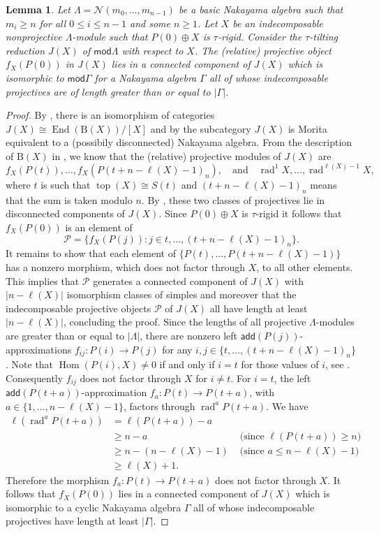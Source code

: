 \documentclass[11pt]{amsart}
\newcommand{\add}{\mathsf{add}}
\newcommand{\mods}{\mathsf{mod}}
\newcommand{\bcomp}{\mathrm{B}}
\newcommand{\Pcal}{\mathcal{P}}
\DeclareMathOperator{\Hom}{\mathrm{Hom}}
\DeclareMathOperator{\End}{\mathrm{End}}
\DeclareMathOperator{\topp}{\mathrm{top}}
\DeclareMathOperator{\rad}{\mathrm{rad}}
\newtheorem{lemma}[theorem]{Lemma}
\theoremstyle{definition}
\begin{document}
\begin{lemma}\label{lem:longreduction}
    Let $\Lambda = \mathcal{N}(m_0, \dots, m_{n-1})$ be a basic Nakayama algebra such that $m_i \geq n$ for all $0 \leq i \leq n-1$ and some $n \geq 1$. Let $X$ be an indecomposable nonprojective $\Lambda$-module such that $P(0) \oplus X$ is $\tau$-rigid. Consider the $\tau$-tilting reduction $J(X)$ of $\mods \Lambda$ with respect to $X$. The (relative) projective object $f_X(P(0))$ in $J(X)$ lies in a connected component of $J(X)$ which is isomorphic to $\mods \Gamma$ for a Nakayama algebra $\Gamma$ all of whose indecomposable projectives are of length greater than or equal to $|\Gamma|$. 
\end{lemma}
\begin{proof}
    By \cite{jassoreduction}, there is an isomorphism of categories $J(X) \cong \End(\bcomp(X))/[X]$ and by \cite[Lem. 4.7]{bkt} the subcategory $J(X)$ is Morita equivalent to a (possibily disconnected) Nakayama algebra. From the description of  $\bcomp(X)$ in \cite[Prop. 4.9]{bkt}, we know that the (relative) projective modules of $J(X)$ are 
    \[ f_X(P(t)), \dots, f_X(P(t+n-\ell(X)-1)_n), \quad \text{and}\quad \rad^1 X, \dots, \rad^{\ell(X)-1} X, \] 
    where $t$ is such that $\topp(X) \cong S(t)$ and $(t+n-\ell(X)-1)_n$ means that the sum is taken modulo $n$. By \cite[Prop. 6.5]{bkt}, these two classes of projectives lie in disconnected components of $J(X)$. Since $P(0) \oplus X$ is $\tau$-rigid it follows that $f_X(P(0))$ is an element of  
    \[ \Pcal = \{f_X (P(j)): j \in t, \dots, (t+n-\ell(X)-1)_n\}.\]
    It remains to show that each element of $\{P(t), \dots, P(t+n-\ell(X)-1)\}$ has a nonzero morphism, which does not factor through $X$, to all other elements. This implies that $\Pcal$ generates a connected component of $J(X)$ with $|n- \ell(X)|$ isomorphism classes of simples and moreover that the indecomposable projective objects $\Pcal$ of $J(X)$ all have length at least $|n- \ell(X)|$, concluding the proof. Since the lengths of all projective $\Lambda$-modules are greater than or equal to $|\Lambda|$, there are nonzero left $\add(P(j))$-approximations $f_{ij}: P(i) \to P(j)$ for any $i,j \in \{ t, \dots, (t+n-\ell(X)-1)_n\}$. Note that $\Hom(P(i),X)\neq 0$ if and only if $i = t$ for those values of $i$, see \cite[Prop. 4.6(10)]{bkt}. Consequently $f_{ij}$ does not factor through $X$ for $i\neq t$. For $i = t$, the left $\add(P(t+a))$-approximation $f_a: P(t) \to P(t+a)$, with $a \in \{1, \dots, n-\ell(X)-1\}$, factors through $\rad^a P(t+a)$. We have
    \begin{align*} 
    \ell(\rad^a P(t+a)) &= \ell(P(t+a)) - a \\
    & \geq n -a &\text{ (since $\ell(P(t+a))\geq n$)}\\
    & \geq n- (n-\ell(X)-1) &\text{ (since $a \leq n-\ell(X)-1$)} \\
    & \geq \ell(X)+1.
    \end{align*}
    Therefore the morphism $f_a: P(t) \to P(t+a)$ does not factor through $X$. It follows that $f_X(P(0))$ lies in a connected component of $J(X)$ which is isomorphic to a cyclic Nakayama algebra $\Gamma$ all of whose indecomposable projectives have length at least $|\Gamma|$. 
\end{proof}
\end{document}
